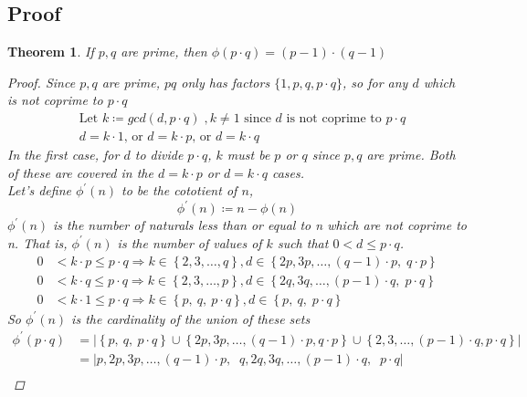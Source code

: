 \documentclass{article}
\newtheorem{theorem}{Theorem}
\begin{document}
\subsection{Proof}
\begin{theorem}
    If $p, q$ are prime, then $\phi(p \cdot q) = (p-1) \cdot (q-1)$
    \begin{proof}
        Since $p, q$ are prime, $pq$ only has factors $\{1, p, q, p \cdot q\}$, so for any $d$ which is not coprime to $p \cdot q$
        \begin{align*}
             & \text{Let }k \coloneqq gcd(d, p \cdot q) \;, k \neq 1 \text{ since } d \text{ is not coprime to } p \cdot q \\
             & d = k \cdot 1 \text{, or } d = k \cdot p \text{, or } d = k \cdot q
        \end{align*}
        In the first case, for $d$ to divide $p \cdot q$, $k$ must be $p$ or $q$ since $p, q$ are prime.
        Both of these are covered in the $d = k \cdot p$ or $d = k \cdot q$ cases. \\
        Let's define $\phi^{'}(n)$ to be the cototient of $n$,
        \[
            \phi^{'}(n) \coloneqq n - \phi(n)
        \]
        $\phi^{'}(n)$ is the number of naturals \emph{less than} or equal to n which are \emph{not} coprime to n.
        That is, $\phi^{'}(n)$ is the number of values of $k$ such that $0 < d \leq p \cdot q$.
        \begin{align*}
            0 & < k \cdot p \leq p \cdot q \Rightarrow k \in \left\{ 2, 3, \ldots, q \right\},     d \in \left\{2p,   3p, \ldots, (q-1) \cdot p, \; q \cdot p \right\} \\
            0 & < k \cdot q \leq p \cdot q \Rightarrow k \in \left\{ 2, 3, \ldots, p \right\},     d \in \left\{2q,   3q, \ldots, (p-1) \cdot q, \; p \cdot q \right\} \\
            0 & < k \cdot 1 \leq p \cdot q \Rightarrow k \in \left\{ p,\: q,\: p \cdot q \right\}, d \in \left\{ p, \: q,                        \; p \cdot q \right\}
        \end{align*}
        So $\phi^{'}(n)$ is the cardinality of the union of these sets
        \begin{align*}
            \phi^{'}(p \cdot q)         & = \left| \left\{p,\: q,\: p\cdot q \right\} \cup \left\{ 2p, 3p, \ldots, (q-1) \cdot p, q \cdot p \right\} \cup \left\{ 2, 3, \ldots,  (p-1) \cdot q, p \cdot q \right\} \right| \\
                                        & = \left| p, 2p, 3p, \ldots, (q-1) \cdot p, \;\; q, 2q, 3q, \ldots, (p-1) \cdot q, \;\; p \cdot q\right|                                                                          \\

\end{align*}
\end{proof}
\end{theorem}
\end{document}
